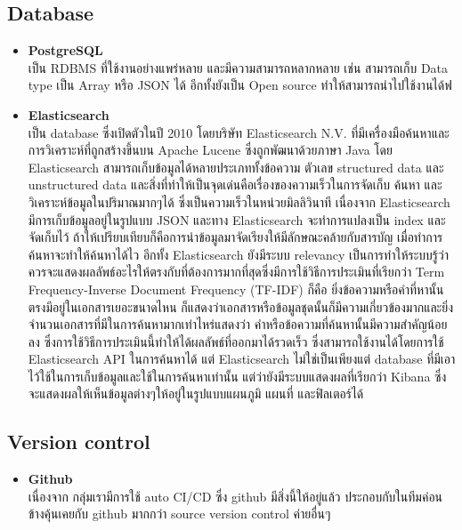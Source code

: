 \documentclass[12pt,oneside,openright,a4paper]{cpe-thai-project}
\begin{document}
\subsection{Database}
\begin{itemize}
  \item \textbf{PostgreSQL} \\
\hspace*{1cm} เป็น RDBMS ที่ใช้งานอย่างแพร่หลาย และมีความสามารถหลากหลาย เช่น สามารถเก็บ Data type เป็น Array หรือ JSON ได้ อีกทั้งยังเป็น Open source ทำให้สามารถนำไปใช้งานได้ฟ
  \item \textbf{Elasticsearch} \\
\hspace*{1cm} เป็น database ซึ่งเปิดตัวในปี 2010 โดยบริษัท Elasticsearch N.V. ที่มีเครื่องมือค้นหาและการวิเคราะห์ที่ถูกสร้างขึ้นบน Apache Lucene ซึ่งถูกพัฒนาด้วยภาษา Java โดย Elasticsearch สามารถเก็บข้อมูลได้หลายประเภททั้งข้อความ ตัวเลข structured data และ unstructured data และสิ่งที่ทำให้เป็นจุดเด่นคือเรื่องของความเร็วในการจัดเก็บ ค้นหา และวิเคราะห์ข้อมูลในปริมาณมากๆได้ ซึ่งเป็นความเร็วในหน่วยมิลลิวินาที เนื่องจาก Elasticsearch มีการเก็บข้อมูลอยู่ในรูปแบบ JSON และทาง Elasticsearch จะทำการแปลงเป็น index และจัดเก็บไว้ ถ้าให้เปรียบเทียบก็คือการนำข้อมูลมาจัดเรียงให้มีลักษณะคล้ายกับสารบัญ เมื่อทำการค้นหาจะทำให้ค้นหาได้ไว อีกทั้ง Elasticsearch ยังมีระบบ relevancy เป็นการทำให้ระบบรู้ว่าควรจะแสดงผลลัพธ์อะไรให้ตรงกับที่ต้องการมากที่สุดซึ่งมีการใช้วิธีการประเมินที่เรียกว่า Term Frequency-Inverse Document Frequency (TF-IDF) ก็คือ ยิ่งข้อความหรือคำที่หานั้นตรงมีอยู่ในเอกสารเยอะขนาดไหน ก็แสดงว่าเอกสารหรือข้อมูลชุดนั้นก็มีความเกี่ยวข้องมากและยิ่งจำนวนเอกสารที่มีในการค้นหามากเท่าไหร่แสดงว่า คำหรือข้อความที่ค้นหานั้นมีความสำคัญน้อยลง ซึ่งการใช้วิธีการประเมินนี้ทำให้ได้ผลลัพธ์ที่ออกมาได้รวดเร็ว ซึ่งสามารถใช้งานได้โดยการใช้ Elasticsearch API ในการค้นหาได้ แต่ Elasticsearch ไม่ใช่เป็นเพียงแต่ database ที่มีเอาไว้ใช้ในการเก็บข้อมูลและใช้ในการค้นหาเท่านั้น แต่ว่ายังมีระบบแสดงผลที่เรียกว่า Kibana ซึ่งจะแสดงผลให้เห็นข้อมูลต่างๆให้อยู่ในรูปแบบแผนภูมิ แผนที่ และฟิลเตอร์ได้
\end{itemize}
\subsection{Version control}
\begin{itemize}
  \item \textbf{Github} \\
\hspace*{1cm} เนื่องจาก กลุ่มเรามีการใช้ auto CI/CD ซึ่ง github มีสิ่งนี้ให้อยู่แล้ว ประกอบกับในทีมค่อนข้างคุ้นเคยกับ github มากกว่า source version control ค่ายอื่นๆ
\end{itemize}
\end{document}
